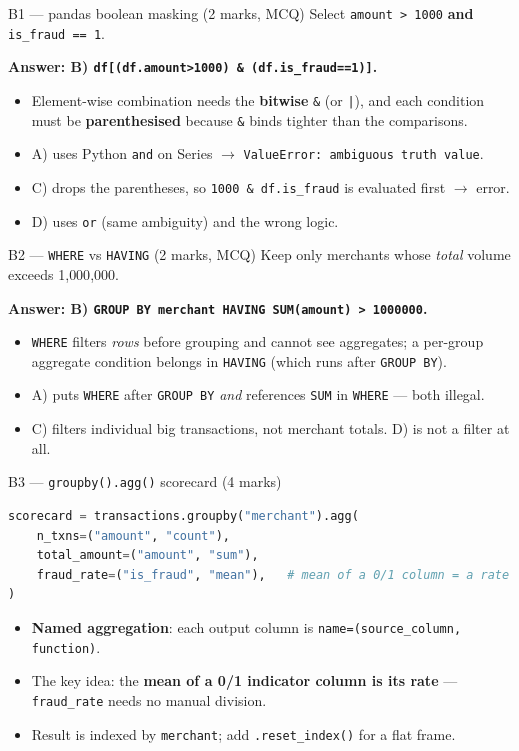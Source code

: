 \documentclass[aspectratio=169,11pt]{beamer}
\begin{document}
\begin{frame}[fragile]{B1 --- pandas boolean masking \hfill (2 marks, MCQ)}
Select \texttt{amount > 1000} \textbf{and} \texttt{is\_fraud == 1}.
\medskip

\textbf{Answer: B) \textcolor{cgreen}{\texttt{df[(df.amount>1000) \& (df.is\_fraud==1)]}}.}
\begin{itemize}
  \item Element-wise combination needs the \textbf{bitwise} \texttt{\&} (or \texttt{|}), and each condition must be \textbf{parenthesised} because \texttt{\&} binds tighter than the comparisons.
  \item A) uses Python \texttt{and} on Series $\to$ \textcolor{cred}{\texttt{ValueError: ambiguous truth value}}.
  \item C) drops the parentheses, so \texttt{1000 \& df.is\_fraud} is evaluated first $\to$ error.
  \item D) uses \texttt{or} (same ambiguity) and the wrong logic.
\end{itemize}
\end{frame}

\begin{frame}[fragile]{B2 --- \texttt{WHERE} vs \texttt{HAVING} \hfill (2 marks, MCQ)}
Keep only merchants whose \emph{total} volume exceeds 1{,}000{,}000.
\medskip

\textbf{Answer: B) \textcolor{cgreen}{\texttt{GROUP BY merchant HAVING SUM(amount) > 1000000}}.}
\begin{itemize}
  \item \texttt{WHERE} filters \emph{rows} before grouping and cannot see aggregates; a per-group aggregate condition belongs in \texttt{HAVING} (which runs after \texttt{GROUP BY}).
  \item A) puts \texttt{WHERE} after \texttt{GROUP BY} \emph{and} references \texttt{SUM} in \texttt{WHERE} --- both illegal.
  \item C) filters individual big transactions, not merchant totals. D) is not a filter at all.
\end{itemize}
\end{frame}

\begin{frame}[fragile]{B3 --- \texttt{groupby().agg()} scorecard \hfill (4 marks)}
\begin{lstlisting}[language=Python]
scorecard = transactions.groupby("merchant").agg(
    n_txns=("amount", "count"),
    total_amount=("amount", "sum"),
    fraud_rate=("is_fraud", "mean"),   # mean of a 0/1 column = a rate
)
\end{lstlisting}
\begin{itemize}\footnotesize
  \item \textbf{Named aggregation}: each output column is \texttt{name=(source\_column, function)}.
  \item The key idea: the \textbf{mean of a 0/1 indicator column is its rate} --- \texttt{fraud\_rate} needs no manual division.
  \item Result is indexed by \texttt{merchant}; add \texttt{.reset\_index()} for a flat frame.
\end{itemize}
\end{frame}
\end{document}
